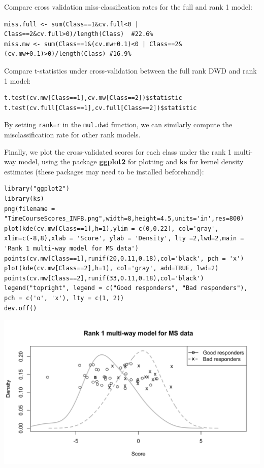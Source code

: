 \documentclass[]{article}
\begin{document}
Compare cross validation miss-classification rates for the full and rank
1 model:

\begin{verbatim}
miss.full <- sum(Class==1&cv.full<0 | Class==2&cv.full>0)/length(Class)  #22.6%
miss.mw <- sum(Class==1&(cv.mw+0.1)<0 | Class==2&(cv.mw+0.1)>0)/length(Class) #16.9%
\end{verbatim}

Compare t-statistics under cross-validation between the full rank DWD
and rank 1 model:

\begin{verbatim}
t.test(cv.mw[Class==1],cv.mw[Class==2])$statistic
t.test(cv.full[Class==1],cv.full[Class==2])$statistic 
\end{verbatim}

By setting \texttt{rank=r} in the \texttt{mul.dwd} function, we can
similarly compute the misclassification rate for other rank models.

Finally, we plot the cross-validated scores for each class under the
rank 1 multi-way model, using the package \textbf{ggplot2} for plotting
and \textbf{ks} for kernel density estimates (these packages may need to
be installed beforehand):

\begin{verbatim}
library("ggplot2")
library(ks)
png(filename = "TimeCourseScores_INFB.png",width=8,height=4.5,units='in',res=800)
plot(kde(cv.mw[Class==1],h=1),ylim = c(0,0.22), col='gray', xlim=c(-8,8),xlab = 'Score', ylab = 'Density', lty =2,lwd=2,main = 'Rank 1 multi-way model for MS data')
points(cv.mw[Class==1],runif(20,0.11,0.18),col='black', pch = 'x')
plot(kde(cv.mw[Class==2],h=1), col='gray', add=TRUE, lwd=2)
points(cv.mw[Class==2],runif(33,0.11,0.18),col='black')
legend("topright", legend = c("Good responders", "Bad responders"), pch = c('o', 'x'), lty = c(1, 2))
dev.off()
\end{verbatim}

\includegraphics{TimeCourseScores_INFB.png}
\end{document}
